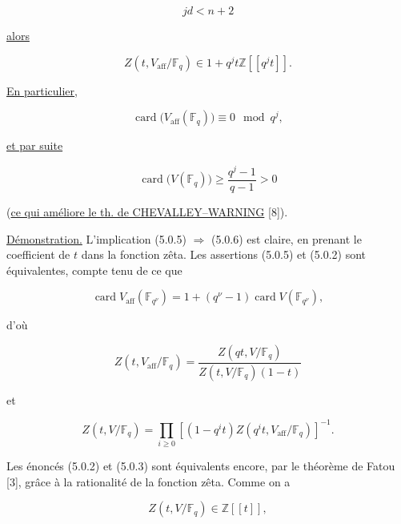\begin{equation}\tag{5.0.4}
jd<n+2
\end{equation}

\underline{alors}

\begin{equation}\tag{5.0.5}
Z(t,V_{\mathrm{aff}}/\mathbb F_q)
\in1+q^jt\mathbb Z[[q^jt]].
\end{equation}

\underline{En particulier},

\begin{equation}\tag{5.0.6}
\operatorname{card}\bigl(V_{\mathrm{aff}}(\mathbb F_q)\bigr)
\equiv0\mod{q^j},
\end{equation}

\underline{et par suite}

\begin{equation}\tag{5.0.6 bis}
\operatorname{card}\bigl(V(\mathbb F_q)\bigr)
\geq\frac{q^j-1}{q-1}>0
\end{equation}

\noindent
(\underline{ce qui améliore le th. de CHEVALLEY--WARNING} [8]).


\underline{Démonstration.}
L'implication (5.0.5) $\Rightarrow$ (5.0.6) est claire, en prenant le
coefficient de $t$ dans la fonction zêta. Les assertions (5.0.5) et (5.0.2)
sont équivalentes, compte tenu de ce que

\begin{equation}\tag{5.0.7}
\operatorname{card}V_{\mathrm{aff}}(\mathbb F_{q^\nu})
=1+(q^\nu-1)\operatorname{card}V(\mathbb F_{q^\nu}),
\end{equation}

d'où

\begin{equation}\tag{5.0.8}
Z(t,V_{\mathrm{aff}}/\mathbb F_q)
=\frac{Z(qt,V/\mathbb F_q)}
{Z(t,V/\mathbb F_q)(1-t)}
\end{equation}

et

\begin{equation}\tag{5.0.9}
Z(t,V/\mathbb F_q)
=\prod_{i\geq0}\left[(1-q^it)
Z(q^it,V_{\mathrm{aff}}/\mathbb F_q)\right]^{-1}.
\end{equation}

Les énoncés (5.0.2) et (5.0.3) sont équivalents encore, par le théorème de
Fatou [3], grâce à la rationalité de la fonction zêta. Comme on a

\begin{equation}\tag{5.0.10}
Z(t,V/\mathbb F_q)\in\mathbb Z[[t]],
\end{equation}

